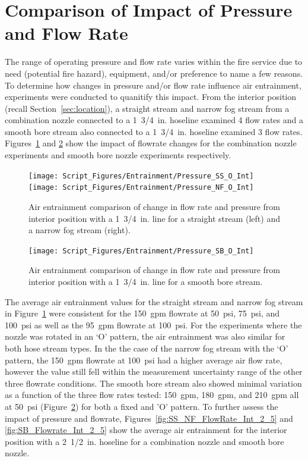 \documentclass[12pt,oneside]{book}
\begin{document}
\section{Comparison of Impact of Pressure and Flow Rate}

The range of operating pressure and flow rate varies within the fire service due to need (potential fire hazard), equipment, and/or preference to name a few reasons. To determine how changes in pressure and/or flow rate influence air entrainment, experiments were conducted to quanitify this impact. From the interior position (recall Section~\ref{sec:location}), a straight stream and narrow fog stream from a combination nozzle connected to a 1~3/4~in. hoseline examined 4 flow rates and a smooth bore stream also connected to a 1~3/4~in. hoseline examined 3 flow rates. Figures~\ref{fig:SS_NF_FlowRate_Int} and \ref{fig:SB_Flowrate_Int} show the impact of flowrate changes for the combination nozzle experiments and smooth bore nozzle experiments respectively.

\begin{figure}[!ht]
\centering
\texttt{[image: Script\_Figures/Entrainment/Pressure\_SS\_O\_Int]}
\texttt{[image: Script\_Figures/Entrainment/Pressure\_NF\_O\_Int]}
\caption[Air Entrainment Comparison of Pressure and Flow Rate for Interior Combination Nozzle from 1~3/4~in. Line]{Air entrainment comparison of change in flow rate and pressure from interior position with a 1~3/4~in. line for a straight stream (left) and a narrow fog stream (right).}
\label{fig:SS_NF_FlowRate_Int}
\end{figure}

\begin{figure}[!ht]
\centering
\texttt{[image: Script\_Figures/Entrainment/Pressure\_SB\_O\_Int]}
\caption[Air Entrainment Comparison of Pressure and Flow Rate for Interior Smooth Bore Nozzle from 1~3/4~in. Line]{Air entrainment comparison of change in flow rate and pressure from interior position with a 1~3/4~in. line for a smooth bore stream.}
\label{fig:SB_Flowrate_Int}
\end{figure}

The average air entrainment values for the straight stream and narrow fog stream in Figure~\ref{fig:SS_NF_FlowRate_Int} were consistent for the 150~gpm flowrate at 50~psi, 75~psi, and 100~psi as well as the 95~gpm flowrate at 100~psi. For the experiments where the nozzle was rotated in an `O' pattern, the air entrainment was also similar for both hose stream types. In the the case of the narrow fog stream with the `O' pattern, the 150~gpm flowrate at 100~psi had a higher average air flow rate, however the value still fell within the measurement uncertainty range of the other three flowrate conditions. The smooth bore stream also showed minimal variation as a function of the three flow rates tested: 150~gpm, 180~gpm, and 210~gpm all at 50~psi (Figure~\ref{fig:SB_Flowrate_Int}) for both a fixed and 'O' pattern. To further assess the impact of pressure and flowrate, Figures~\ref{fig:SS_NF_FlowRate_Int_2_5} and \ref{fig:SB_Flowrate_Int_2_5} show the average air entrainment for the interior position with a 2~1/2~in. hoseline for a combination nozzle and smooth bore nozzle.
\end{document}
